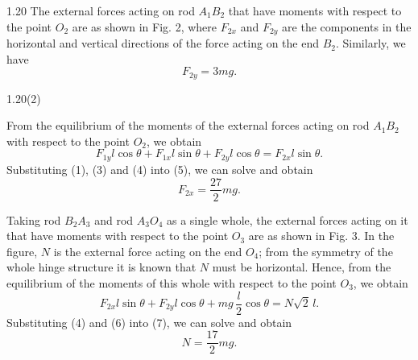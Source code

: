 \begin{solution}{1.20}
The external forces acting on rod $A_1B_2$ that have moments with respect to the point $O_2$ are as shown in Fig. 2, where $F_{2x}$ and $F_{2y}$ are the components in the horizontal and vertical directions of the force acting on the end $B_2$. Similarly, we have
\begin{equation}
F_{2y}=3mg. \tag{4}
\end{equation}

\begin{figbox}{1.20(2)}
\end{figbox}

From the equilibrium of the moments of the external forces acting on rod $A_1B_2$ with respect to the point $O_2$, we obtain
\begin{equation}
F_{1y}l\cos\theta+F_{1x}l\sin\theta+F_{2y}l\cos\theta=F_{2x}l\sin\theta. \tag{5}
\end{equation}
Substituting (1), (3) and (4) into (5), we can solve and obtain
\begin{equation}
F_{2x}=\frac{27}{2}mg. \tag{6}
\end{equation}

Taking rod $B_2A_3$ and rod $A_3O_4$ as a single whole, the external forces acting on it that have moments with respect to the point $O_3$ are as shown in Fig. 3. In the figure, $N$ is the external force acting on the end $O_4$; from the symmetry of the whole hinge structure it is known that $N$ must be horizontal. Hence, from the equilibrium of the moments of this whole with respect to the point $O_3$, we obtain
\begin{equation}
F_{2x}l\sin\theta+F_{2y}l\cos\theta+mg\,\frac{l}{2}\cos\theta=N\sqrt{2}\,l. \tag{7}
\end{equation}
Substituting (4) and (6) into (7), we can solve and obtain
\begin{equation}
N=\frac{17}{2}mg. \tag{8}
\end{equation}


\end{solution}
